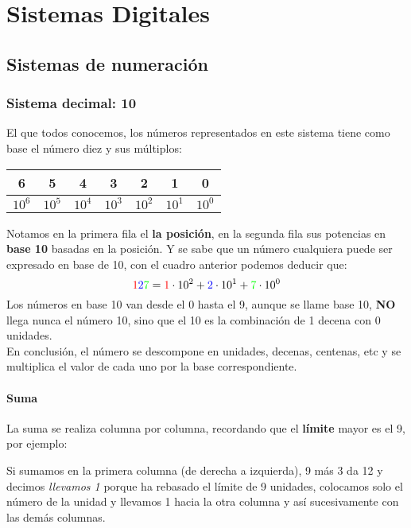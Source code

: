 \documentclass[
	12pt, %
	fleqn, %
	a4paper, %
	oneside, %
]{LegrandOrangeBook}
\begin{document}
\part{Sistemas Digitales}
\chapter{Sistemas de numeración}
\section{Sistema decimal: 10}
El que todos conocemos, los números representados en este sistema tiene como base el número diez y sus múltiplos:
\begin{center}
\begin{tabular}{|c|c|c|c|c|c|c|}
\hline
6      & 5      & 4      & 3      & 2      & 1      & 0      \\ \hline
$10^6$ & $10^5$ & $10^4$ & $10^3$ & $10^2$ & $10^1$ & $10^0$ \\ \hline
\end{tabular}
\end{center}
Notamos en la primera fila el \textbf{la posición}, en la segunda fila sus potencias en \textbf{base 10} basadas en la posición. Y se sabe que un número cualquiera puede ser expresado en base de 10, con el cuadro anterior podemos deducir que:
\begin{displaymath}
\textcolor{red}{1}\textcolor{blue}{2}\textcolor{green}{7}=\textcolor{red}{1}\cdot 10^2 + \textcolor{blue}{2}\cdot 10^1 + \textcolor{green}{7}\cdot 10^0
\end{displaymath}
Los números en base 10 van desde el 0 hasta el 9, aunque se llame base 10, \textbf{NO} llega nunca el número 10, sino que el 10 es la combinación de 1 decena con 0 unidades.\\
En conclusión, el número se descompone en unidades, decenas, centenas, etc y se multiplica el valor de cada uno por la base correspondiente.
\subsection{Suma}
La suma se realiza columna por columna, recordando que el \textbf{límite} mayor es el 9, por ejemplo:
\begin{center}
\end{center}
Si sumamos en la primera columna (de derecha a izquierda), 9 más 3 da 12 y decimos \textit{llevamos 1} porque ha rebasado el límite de 9 unidades, colocamos solo el número de la unidad y llevamos 1 hacia la otra columna y así sucesivamente con las demás columnas.
\end{document}
